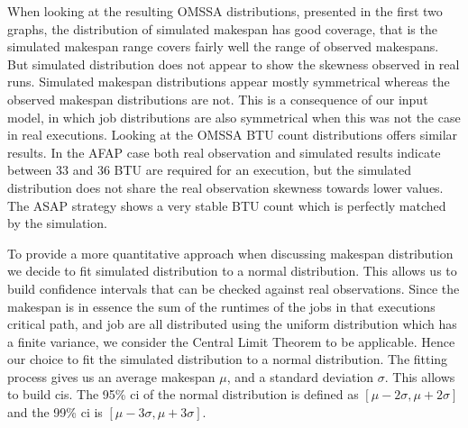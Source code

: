 \documentclass[10pt,conference,compsocconf]{IEEEtran}
\begin{document}
When looking at the resulting OMSSA distributions, presented in the first two
graphs, the distribution of simulated makespan has good coverage, that is the
simulated makespan range covers fairly well the range of observed makespans. But
simulated distribution does not appear to show the skewness observed in real
runs. Simulated makespan distributions appear mostly symmetrical whereas the
observed makespan distributions are not. This is a consequence of our input
model, in which job distributions are also symmetrical when this was not the
case in real executions. Looking at the OMSSA BTU count distributions offers
similar results.  In the AFAP case both real observation and simulated results
indicate between 33 and 36 BTU are required for an execution, but the simulated
distribution does not share the real observation skewness towards lower values.
The ASAP strategy shows a very stable BTU count which is perfectly matched by
the simulation.

To provide a more quantitative approach when discussing makespan distribution we
decide to fit simulated distribution to a normal distribution. This allows us to
build confidence intervals that can be checked against real observations.  Since
the makespan is in essence the sum of the runtimes of the jobs in that
executions critical path, and job are all distributed using the uniform
distribution which has a finite variance, we consider the Central Limit Theorem
to be applicable. Hence our choice to fit the simulated distribution to a normal
distribution. The fitting process gives us an average makespan $\mu{}$, and a
standard deviation $\sigma{}$. This allows to build \acp{ci}. The 95\% \ac{ci}
of the normal distribution is defined as $[\mu{}-2\sigma{},\mu{}+2\sigma{}]$ and
the 99\% \ac{ci} is $[\mu{}-3\sigma{},\mu{}+3\sigma{}]$.
\end{document}
